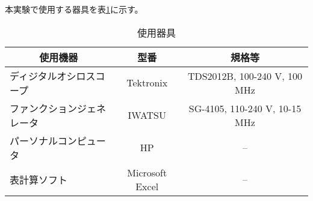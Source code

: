 本実験で使用する器具を表\ref{tb1}に示す。

\begin{table}[ht]
  \centering
  \caption{使用器具}
  \begin{tabular}[t]{lcc}
  \toprule
  \multicolumn{1}{c}{使用機器}&\multicolumn{1}{c}{型番}&規格等\\
  \midrule
  ディジタルオシロスコープ&Tektronix&TDS2012B, 100-240 V, 100 MHz\\
  ファンクションジェネレータ&IWATSU&SG-4105, 110-240 V, 10-15 MHz\\
  パーソナルコンピュータ&HP&--\\
  表計算ソフト&Microsoft Excel&--\\
  \bottomrule
  \end{tabular}
  \label{tb1}
\end{table}

